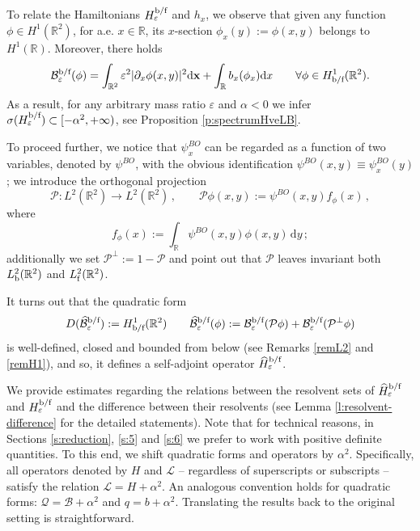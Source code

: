 \documentclass[a4paper,11pt,reqno]{amsart}
\newtheorem{theorem}{Theorem}[section]
\theoremstyle{definition}
\numberwithin{equation}{section}
\newcommand{\RE}{\mathbb R}
\newcommand{\BB}{\mathcal B}
\newcommand{\QQ}{\mathcal Q}
\newcommand{\PP}{\mathcal P}
\newcommand{\Lscr}{\mathscr{L}}
\newcommand{\ve}{\varepsilon}
\renewcommand{\d}{\mathrm{d}}
\newcommand{\x}{{\bf  x}}
\newcommand{\bof}{\text{\rm b/f}}
\newcommand{\bos}{\text{\rm b}}
\newcommand{\fer}{\text{\rm f}}
\begin{document}
To relate the Hamiltonians  $H^{\bof}_\ve$ and $h_x$, we observe that given any function $\phi\in H^1(\RE^2)$, 
for a.e. $x\in \RE$, its $x$-section $\phi_x(y):= \phi(x,y)$ belongs to $H^1(\RE)$. Moreover,  there holds 
\[
\BB^{\bof}_{\ve}( \phi)= \int_{\RE^2} \ve^2 |\partial_x \phi(x,y)|^2 \d\x  +\int_\RE  b_x(\phi_x)\d x \qquad \forall \phi \in H_{\bof}^1(\RE^2).    
\]
As a result, for any arbitrary mass ratio $\ve$ and $\alpha <0$ we infer  $\sigma(H^{\bof}_\ve)\subset [-\alpha^2,+\infty)$, see Proposition \ref{p:spectrumHveLB}.


To proceed further, we  notice that  $\psi^{BO}_x$  can be regarded as a function of two variables, denoted by  $\psi^{BO}$, with the obvious identification $\psi^{BO}(x,y)\equiv \psi^{BO}_x(y)$;  we introduce the orthogonal  projection 
\[
\mathcal{P}:L^{2}(\RE^{2})\to L^{2}(\RE^{2})\,,\qquad
\mathcal{P} \phi(x,y) := %
\psi^{BO}(x,y) f_\phi(x) \, ,
\]
 where   
 \[
    f_\phi(x) := \int_{\RE} {\psi^{BO}(x,y)} \phi(x,y)\, \d y  \,;
    \]
    additionally we set $\mathcal{P}^\perp  :=1 - \mathcal P$ and point out that $\mathcal P$ leaves invariant both $ L^{2}_{\bos}(\RE^{2})$ and  $L^{2}_{\fer}(\RE^{2})$.
    
It turns out  that  the quadratic form 
\[
 D(\widehat{\BB}^{\bof}_\ve): =   H_{\bof}^1(\RE^2) \qquad \widehat{\BB}^{\bof}_\ve(\phi)  : = 
 {\BB}^{\bof}_\ve (\PP\phi)+ {\BB}^{\bof}_\ve(\PP^\perp\phi)
\]
is well-defined, closed and bounded from below (see Remarks \ref{remL2} and \ref{remH1}), and so,  it defines a self-adjoint operator $\widehat H^{\bof}_\ve$.

 We provide estimates regarding the relations between the resolvent sets of  $\widehat H^{\bof}_\ve$ and $H^{\bof}_\ve$ and the difference between their resolvents (see Lemma \ref{l:resolvent-difference} for the detailed statements).  Note that for technical reasons, in Sections \ref{s:reduction}, \ref{s:5} and \ref{s:6} we prefer to work with positive definite quantities. To this end, we shift quadratic forms and operators by $\alpha^2$. Specifically, all operators denoted by  $H$ and $\Lscr$ -- regardless of superscripts or subscripts -- satisfy the relation  $\Lscr = H +\alpha^2$. An analogous convention holds for quadratic forms:  $\QQ = \BB+\alpha^2$ and $q = b+\alpha^2$. Translating the results back to the original setting is straightforward.
\end{document}
